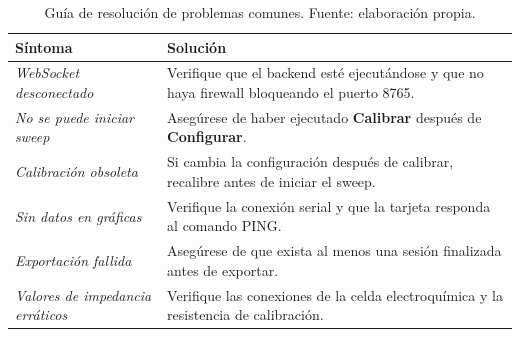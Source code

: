 \documentclass[11pt,a4paper,spanish]{book}
\begin{document}
\begin{table}[ht]
\centering
\begin{tabular}{p{4.5cm} p{9cm}}
\hline\hline
S\'{i}ntoma & Soluci\'{o}n \\ [0.5ex]
\hline
\textit{WebSocket desconectado} & Verifique que el backend est\'{e} ejecut\'{a}ndose y que no haya firewall bloqueando el puerto 8765. \\
\textit{No se puede iniciar sweep} & Aseg\'{u}rese de haber ejecutado \textbf{Calibrar} despu\'{e}s de \textbf{Configurar}. \\
\textit{Calibraci\'{o}n obsoleta} & Si cambia la configuraci\'{o}n despu\'{e}s de calibrar, recalibre antes de iniciar el sweep. \\
\textit{Sin datos en gr\'{a}ficas} & Verifique la conexi\'{o}n serial y que la tarjeta responda al comando PING. \\
\textit{Exportaci\'{o}n fallida} & Aseg\'{u}rese de que exista al menos una sesi\'{o}n finalizada antes de exportar. \\
\textit{Valores de impedancia err\'{a}ticos} & Verifique las conexiones de la celda electroqu\'{i}mica y la resistencia de calibraci\'{o}n. \\
\hline
\end{tabular}
\caption[Resoluci\'{o}n de problemas]{Gu\'{i}a de resoluci\'{o}n de problemas comunes. Fuente: elaboraci\'{o}n propia.}
\label{tab:resolucion-problemas}
\end{table}
\end{document}
